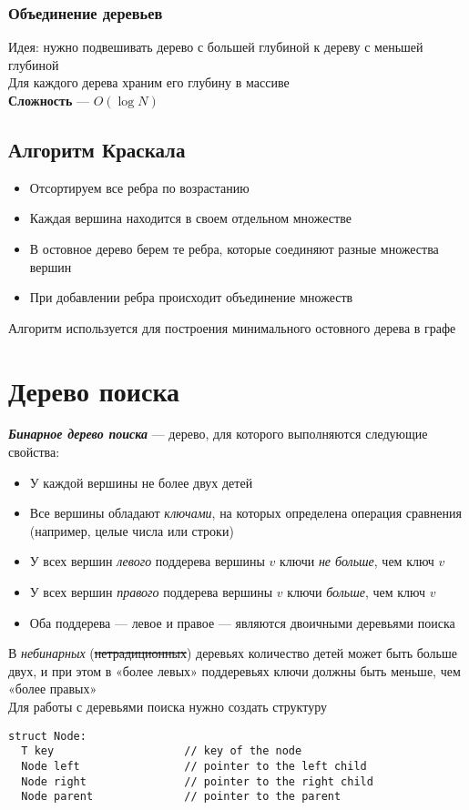 \documentclass[a4paper]{article}
\begin{document}
\subsubsection{Объединение деревьев}
Идея: нужно подвешивать дерево с большей глубиной к дереву с меньшей глубиной\\[2mm]
\indent Для каждого дерева храним его глубину в массиве\\[2mm]
\indent \textbf{Сложность} — $O(\log N)$

\subsection{Алгоритм Краскала}
\begin{itemize}
    \item Отсортируем все ребра по возрастанию
    \item Каждая вершина находится в своем отдельном множестве
    \item В остовное дерево берем те ребра, которые соединяют разные множества вершин
    \item При добавлении ребра происходит объединение множеств
\end{itemize}
Алгоритм используется для построения минимального остовного дерева в графе

\section{Дерево поиска}
\textbf{\textit{Бинарное дерево поиска}} — дерево, для которого выполняются следующие свойства:
\begin{itemize}
\item У каждой вершины не более двух детей
\item Все вершины обладают \textit{ключами}, на которых определена операция сравнения (например, целые числа или строки)
\item У всех вершин \textit{левого} поддерева вершины $v$ ключи \textit{не больше}, чем ключ $v$
\item У всех вершин \textit{правого} поддерева вершины $v$ ключи \textit{больше}, чем ключ $v$
\item Оба поддерева — левое и правое — являются двоичными деревьями поиска
\end{itemize}
В \textit{небинарных} (\sout{нетрадиционных}) деревьях количество детей может быть больше двух, и при этом в «более левых» поддеревьях ключи должны быть меньше, чем «более правых»\\[2mm]
\indent Для работы с деревьями поиска нужно создать структуру
\begin{lstlisting}
struct Node:
  T key                    // key of the node
  Node left                // pointer to the left child
  Node right               // pointer to the right child
  Node parent              // pointer to the parent
\end{lstlisting}
\end{document}
